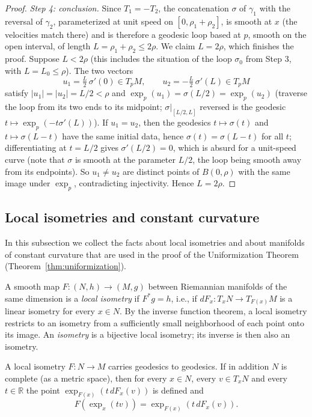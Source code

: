 \begin{proof}
\emph{Step 4: conclusion.} Since $T_1=-T_2$, the concatenation
$\sigma$ of $\gamma_1$ with the reversal of $\gamma_2$,
parameterized at unit speed on $[0,\rho_1+\rho_2]$, is smooth at
$x$ (the velocities match there) and is therefore a geodesic loop
based at $p$, smooth on the open interval, of length
$L=\rho_1+\rho_2\le2\rho$. We claim $L=2\rho$, which finishes the
proof. Suppose $L<2\rho$ (this includes the situation of the loop
$\sigma_0$ from Step 3, with $L=L_0\le\rho$). The two vectors
$$u_1=\tfrac{L}{2}\,\sigma'(0)\in T_pM,\qquad
u_2=-\tfrac{L}{2}\,\sigma'(L)\in T_pM$$
satisfy $|u_1|=|u_2|=L/2<\rho$ and
$\exp_p(u_1)=\sigma(L/2)=\exp_p(u_2)$ (traverse the loop
from its two ends to its midpoint; $\sigma|_{[L/2,L]}$ reversed is
the geodesic $t\mapsto\exp_p(-t\sigma'(L))$). If $u_1=u_2$,
then the geodesics $t\mapsto\sigma(t)$ and $t\mapsto\sigma(L-t)$
have the same initial data, hence
$\sigma(t)=\sigma(L-t)$ for all $t$; differentiating at $t=L/2$
gives $\sigma'(L/2)=0$, which is absurd for a unit-speed curve
(note that $\sigma$ is smooth at the parameter $L/2$, the loop
being smooth away from its endpoints). So $u_1\not=u_2$ are
distinct points of $B(0,\rho)$ with the same image under
$\exp_p$, contradicting injectivity. Hence $L=2\rho$.
\end{proof}

\subsection{Local isometries and constant curvature}

In this subsection we collect the facts about local isometries and
about manifolds of constant curvature that are used in the proof of
the Uniformization Theorem (Theorem~\ref{thm:uniformization}).

\begin{definition}
\label{def:local-isometry}
A smooth map $F\colon (N,h)\to (M,g)$ between Riemannian manifolds
of the same dimension is a {\sl local isometry} if $F^*g=h$, i.e.,
if $dF_x\colon T_xN\to T_{F(x)}M$ is a linear isometry for every
$x\in N$. By the inverse function theorem, a local isometry
restricts to an isometry from a sufficiently small neighborhood of
each point onto its image. An {\sl isometry} is a bijective local
isometry; its inverse is then also an isometry.
\end{definition}

\begin{lemma}
\label{lem:local-isometry-exponential}
A local isometry $F\colon N\to M$ carries geodesics to geodesics.
If in addition $N$ is complete (as a metric space), then for every
$x\in N$, every $v\in T_xN$ and every $t\in \mathbb{R}$ the point
$\exp_{F(x)}\left(t\,dF_x(v)\right)$ is defined and
$$F\left(\exp_x(tv)\right)=\exp_{F(x)}\left(t\,dF_x(v)\right).$$
\end{lemma}

